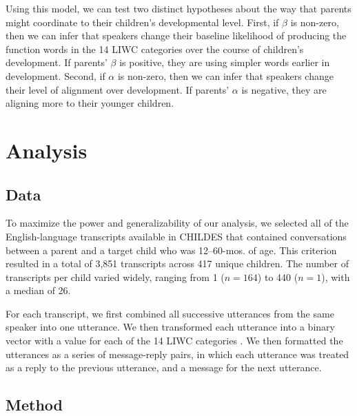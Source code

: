 \documentclass[10pt,letterpaper]{article}
\begin{document}

Using this model, we can test two distinct hypotheses about the way that parents might coordinate to their children's developmental level. First, if $\beta$ is non-zero, then we can infer that speakers change their baseline likelihood of producing the function words in the 14 LIWC categories over the course of children's development. If parents' $\beta$ is positive, they are using simpler words earlier in development. Second, if $\alpha$ is non-zero, then we can infer that speakers change their level of alignment over development. If parents' $\alpha$ is negative, they are aligning more to their younger children.

\section{Analysis}

\subsection{Data}

To maximize the power and generalizability of our analysis, we selected all of the English-language transcripts available in CHILDES \cite{macwhinney2000} that contained conversations between a parent and a target child who was 12--60-mos. of age. This criterion resulted in a total of 3,851 transcripts across 417 unique children. The number of transcripts per child varied widely, ranging from 1 ($n = 164$) to 440 ($n = 1$), with a median of 26.

For each transcript, we first combined all successive utterances from the same speaker into one utterance. We then transformed each utterance into a binary vector with a value for each of the 14 LIWC categories \cite{pennebaker2007}. We then formatted the utterances as a series of message-reply pairs, in which each utterance was treated as a reply to the previous utterance, and a message for the next utterance.

\subsection{Method}
\end{document}
